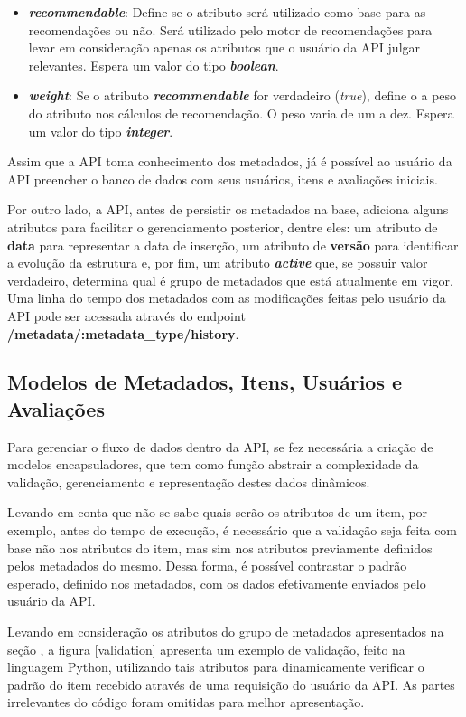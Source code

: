\documentclass[12pt, openright, oneside, a4paper, brazil]{abntex2}
\begin{document}
\begin{itemize}
	\item \textbf{\textit{recommendable}}: Define se o atributo será utilizado como base para as recomendações ou não. Será utilizado pelo motor de recomendações para levar em consideração apenas os atributos que o usuário da API julgar relevantes. Espera um valor do tipo \textbf{\textit{boolean}}.

	\item \textbf{\textit{weight}}: Se o atributo \textbf{\textit{recommendable}} for verdadeiro (\textit{true}), define o a peso do atributo nos cálculos de recomendação. O peso varia de um a dez. Espera um valor do tipo \textbf{\textit{integer}}.
\end{itemize}

Assim que a API toma conhecimento dos metadados, já é possível ao usuário da API preencher o banco de dados com seus usuários, itens e avaliações iniciais.

Por outro lado, a API, antes de persistir os metadados na base, adiciona alguns atributos para facilitar o gerenciamento posterior, dentre eles: um atributo de \textbf{data} para representar a data de inserção, um atributo de \textbf{versão} para identificar a evolução da estrutura e, por fim, um atributo \textbf{\textit{active}} que, se possuir valor verdadeiro, determina qual é grupo de metadados que está atualmente em vigor. Uma linha do tempo dos metadados com as modificações feitas pelo usuário da API pode ser acessada através do endpoint \textbf{/metadata/:metadata\_type/history}.

\subsection{Modelos de Metadados, Itens, Usuários e Avaliações} \label{analisador:modelos}

Para gerenciar o fluxo de dados dentro da API, se fez necessária a criação de modelos encapsuladores, que tem como função abstrair a complexidade da validação, gerenciamento e representação destes dados dinâmicos.

Levando em conta que não se sabe quais serão os atributos de um item, por exemplo, antes do tempo de execução, é necessário que a validação seja feita com base não nos atributos do item, mas sim nos atributos previamente definidos pelos metadados do mesmo. Dessa forma, é possível contrastar o padrão esperado, definido nos metadados, com os dados efetivamente enviados pelo usuário da API.

Levando em consideração os atributos do grupo de metadados apresentados na seção , a figura \ref{validation} apresenta um exemplo de validação, feito na linguagem Python, utilizando tais atributos para dinamicamente verificar o padrão do item recebido através de uma requisição do usuário da API. As partes irrelevantes do código foram omitidas para melhor apresentação.
\end{document}
